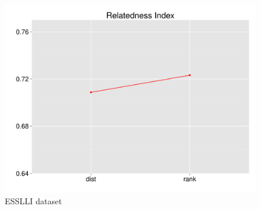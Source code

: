 \documentclass[t]{beamer} %
\begin{document}
\begin{frame}
\begin{columns}
\begin{column}{0.5\textwidth}
      \begin{figure}
        \hspace*{-18pt}   
        \includegraphics[scale=0.30]{img/lapesa_esslli_main_relindex}
        \vspace{-10pt}
        \caption{ESSLLI dataset}
      \end{figure}
      
    \end{column}
  \end{columns}  
  
\end{frame}
\end{document}

